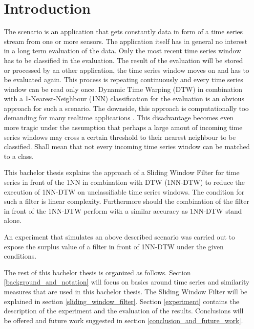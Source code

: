 \section{Introduction} \label{introduction}
The scenario is an application that gets constantly data in form of a time series stream from one or more sensors. The
application itself has in general no interest in a long term evaluation of the data. Only the most recent time series
window has to be classified in the evaluation. The result of the evaluation will be stored or processed by an other
application, the time series window moves on and has to be evaluated again. This process is repeating continuously and
every time series window can be read only once. Dynamic Time Warping (DTW) in combination with a 1-Nearest-Neighbour
(1NN) classification for the evaluation is an obvious approach for such a scenario. The downside, this approach is
computationally too demanding for many realtime applications \cite{xi2006fast}. This disadvantage becomes even more
tragic under the assumption that perhaps a large amout of incoming time series windows may cross a certain threshold to
their nearest neighbour to be classified. Shall mean that not every incoming time series window can be matched to a
class.

This bachelor thesis explains the approach of a Sliding Window Filter for time series in front of the 1NN in combination
with DTW (1NN-DTW) to reduce the execution of 1NN-DTW on unclassifiable time series windows. The condition for such a
filter is linear complexity. Furthermore should the combination of the filter in front of the 1NN-DTW perform with a
similar accuracy as 1NN-DTW stand alone.

An experiment that simulates an above described scenario was carried out to expose the surplus value
of a filter in front of 1NN-DTW under the given conditions.

The rest of this bachelor thesis is organized  as follows. Section \ref{background_and_notation} will focus on basics
around time series and similarity measures that are used in this bachelor thesis. The Sliding Window Filter will be
explained in section \ref{sliding_window_filter}. Section \ref{experiment} contains the description of the experiment
and the evaluation of the results. Conclusions will be offered and future work suggested in section
\ref{conclusion_and_future_work}.
